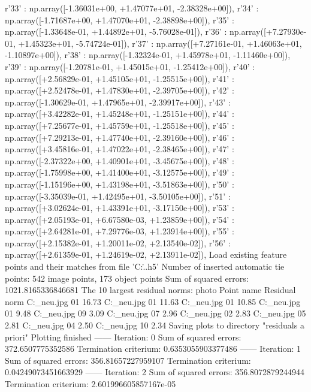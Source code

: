 r'33' : np.array([-1.36031e+00, +1.47077e+01, -2.38328e+00]),
r'34' : np.array([-1.71687e+00, +1.47070e+01, -2.38898e+00]),
r'35' : np.array([-1.33648e-01, +1.44892e+01, -5.76028e-01]),
r'36' : np.array([+7.27930e-01, +1.45323e+01, -5.74724e-01]),
r'37' : np.array([+7.27161e-01, +1.46063e+01, -1.10897e+00]),
r'38' : np.array([-1.32324e-01, +1.45978e+01, -1.11460e+00]),
r'39' : np.array([-1.20781e-01, +1.45015e+01, -1.25412e+00]),
r'40' : np.array([+2.56829e-01, +1.45105e+01, -1.25515e+00]),
r'41' : np.array([+2.52478e-01, +1.47830e+01, -2.39705e+00]),
r'42' : np.array([-1.30629e-01, +1.47965e+01, -2.39917e+00]),
r'43' : np.array([+3.42282e-01, +1.45248e+01, -1.25151e+00]),
r'44' : np.array([+7.25677e-01, +1.45759e+01, -1.25518e+00]),
r'45' : np.array([+7.29213e-01, +1.47740e+01, -2.39160e+00]),
r'46' : np.array([+3.45816e-01, +1.47022e+01, -2.38465e+00]),
r'47' : np.array([-2.37322e+00, +1.40901e+01, -3.45675e+00]),
r'48' : np.array([-1.75998e+00, +1.41400e+01, -3.12575e+00]),
r'49' : np.array([-1.15196e+00, +1.43198e+01, -3.51863e+00]),
r'50' : np.array([-3.35039e-01, +1.42495e+01, -3.50105e+00]),
r'51' : np.array([+3.02624e-01, +1.43391e+01, -3.17150e+00]),
r'53' : np.array([+2.05193e-01, +6.67580e-03, +1.23859e+00]),
r'54' : np.array([+2.64281e-01, +7.29776e-03, +1.23914e+00]),
r'55' : np.array([+2.15382e-01, +1.20011e-02, +2.13540e-02]),
r'56' : np.array([+2.61359e-01, +1.24619e-02, +2.13911e-02]),
Load existing feature points and their matches from file 'C:\Users\Clemens\PycharmProjects\PhotoVertiefungUe\python\..\features.h5'
Number of inserted automatic tie points: 542 image points, 173 object points
Sum of squared errors: 1021.8165336846681
The 10 largest residual norms:
photo	Point name	Residual norm
C:\Users\Clemens\Desktop\fotos_neu\1.jpg	01	16.73
C:\Users\Clemens\Desktop\fotos_neu\4.jpg	01	11.63
C:\Users\Clemens\Desktop\fotos_neu\2.jpg	01	10.85
C:\Users\Clemens\Desktop\fotos_neu\3.jpg	01	9.48
C:\Users\Clemens\Desktop\fotos_neu\4.jpg	09	3.09
C:\Users\Clemens\Desktop\fotos_neu\4.jpg	07	2.96
C:\Users\Clemens\Desktop\fotos_neu\1.jpg	02	2.83
C:\Users\Clemens\Desktop\fotos_neu\4.jpg	05	2.81
C:\Users\Clemens\Desktop\fotos_neu\3.jpg	04	2.50
C:\Users\Clemens\Desktop\fotos_neu\4.jpg	10	2.34
Saving plots to directory "residuals a priori"
Plotting finished
------ Iteration: 0
Sum of squared errors: 372.6507775352586
Termination criterium: 0.6353055903377486
------ Iteration: 1
Sum of squared errors: 356.81657227959107
Termination criterium: 0.04249073451663929
------ Iteration: 2
Sum of squared errors: 356.8072879244944
Termination criterium: 2.601996605857167e-05
